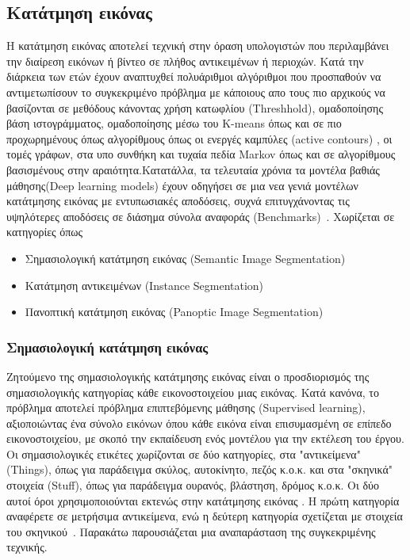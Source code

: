\documentclass[12pt]{article}
\numberwithin{equation}{section}
\begin{document}
\subsection{Κατάτμηση εικόνας}

Η κατάτμηση εικόνας αποτελεί τεχνική στην όραση υπολογιστών που περιλαμβάνει την διαίρεση εικόνων ή βίντεο σε πλήθος αντικειμένων ή περιοχών. Κατά την διάρκεια των ετών έχουν αναπτυχθεί πολυάριθμοι αλγόριθμοι που προσπαθούν να αντιμετωπίσουν το συγκεκριμένο πρόβλημα με κάποιους απο τους πιο αρχικούς να βασίζονται σε μεθόδους κάνοντας χρήση κατωφλίου (Threshhold), ομαδοποίησης βάση ιστογράμματος, ομαδοποίησης μέσω του K-means όπως και σε πιο προχωρημένους όπως αλγορίθμους όπως οι ενεργές καμπύλες (active contours) , οι τομές γράφων, στα υπο συνθήκη και τυχαία πεδία Markov όπως και σε αλγορίθμους βασισμένους στην αραιότητα.Κατατάλλα, τα τελευταία χρόνια τα μοντέλα βαθιάς μάθησης(Deep learning models) έχουν οδηγήσει σε μια νεα γενιά μοντέλων κατάτμησης εικόνας με εντυπωσιακές αποδόσεις, συχνά επιτυγχάνοντας τις υψηλότερες αποδόσεις σε διάσημα σύνολα αναφοράς (Benchmarks)~\cite{DBLP:journals/corr/abs-2001-05566}. Χωρίζεται σε κατηγορίες όπως 

\begin{itemize}
    \item Σημασιολογική κατάτμηση εικόνας (Semantic Image Segmentation)
    \item Κατάτμηση αντικειμένων (Instance Segmentation)
    \item Πανοπτική κατάτμηση εικόνας (Panoptic Image Segmentation)
\end{itemize}

\subsubsection{Σημασιολογική κατάτμηση εικόνας}

Ζητούμενο της σημασιολογικής κατάτμησης εικόνας είναι ο προσδιορισμός της σημασιολογικής κατηγορίας κάθε εικονοστοιχείου μιας εικόνας. Κατά κανόνα, το πρόβλημα αποτελεί πρόβλημα επιπτεβόμενης μάθησης (Supervised learning), αξιοποιώντας ένα σύνολο εικόνων όπου κάθε εικόνα είναι επισυμασμένη σε επίπεδο εικονοστοιχείου, με σκοπό την εκπαίδευση ενός μοντέλου για την εκτέλεση του έργου. Οι σημασιολογικές ετικέτες χωρίζονται σε δύο κατηγορίες, στα "αντικείμενα" (Things), όπως για παράδειγμα σκύλος, αυτοκίνητο, πεζός κ.ο.κ. και στα "σκηνικά" στοιχεία (Stuff), όπως για παράδειγμα ουρανός, βλάστηση, δρόμος κ.ο.κ. Οι δύο αυτοί όροι χρησιμοποιούνται εκτενώς στην κατάτμησης εικόνας . Η πρώτη κατηγορία αναφέρετε σε μετρήσιμα αντικείμενα, ενώ η δεύτερη κατηγορία σχετίζεται με στοιχεία του σκηνικού~\cite{csurka2023semanticimagesegmentationdecades}. Παρακάτω παρουσιάζεται μια αναπαράσταση της συγκεκριμένης τεχνικής.
\end{document}
